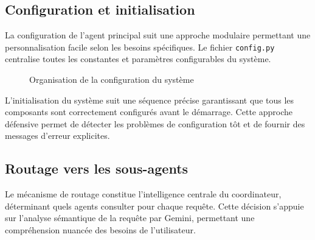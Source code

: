 \subsection{Configuration et initialisation}

La configuration de l'agent principal suit une approche modulaire permettant une personnalisation facile selon les besoins spécifiques. Le fichier \texttt{config.py} centralise toutes les constantes et paramètres configurables du système.

\begin{figure}[H]
\centering
{}
\caption{Organisation de la configuration du système}
\end{figure}

L'initialisation du système suit une séquence précise garantissant que tous les composants sont correctement configurés avant le démarrage. Cette approche défensive permet de détecter les problèmes de configuration tôt et de fournir des messages d'erreur explicites.

\subsection{Routage vers les sous-agents}

Le mécanisme de routage constitue l'intelligence centrale du coordinateur, déterminant quels agents consulter pour chaque requête. Cette décision s'appuie sur l'analyse sémantique de la requête par Gemini, permettant une compréhension nuancée des besoins de l'utilisateur.

